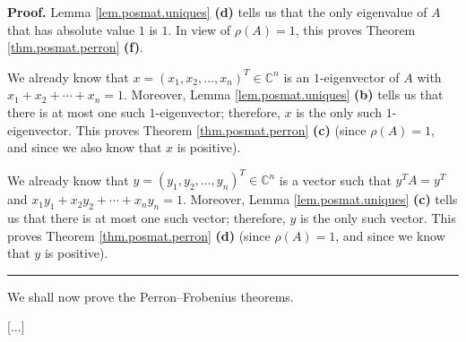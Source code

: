 \documentclass[numbers=enddot,12pt,final,onecolumn,notitlepage]{scrartcl}%
\numberwithin{exer}{subsection}
\theoremstyle{definition}
\newenvironment{proof}[1][Proof]{\noindent\textbf{#1.} }{\ \rule{0.5em}{0.5em}}
\begin{document}
\begin{proof}
Lemma \ref{lem.posmat.uniques} \textbf{(d)} tells us that the only eigenvalue
of $A$ that has absolute value $1$ is $1$. In view of $\rho\left(  A\right)
=1$, this proves Theorem \ref{thm.posmat.perron} \textbf{(f)}.

We already know that $x=\left(  x_{1},x_{2},\ldots,x_{n}\right)  ^{T}%
\in\mathbb{C}^{n}$ is an $1$-eigenvector of $A$ with $x_{1}+x_{2}+\cdots
+x_{n}=1$. Moreover, Lemma \ref{lem.posmat.uniques} \textbf{(b)} tells us that
there is at most one such $1$-eigenvector; therefore, $x$ is the only such
$1$-eigenvector. This proves Theorem \ref{thm.posmat.perron} \textbf{(c)}
(since $\rho\left(  A\right)  =1$, and since we also know that $x$ is positive).

We already know that $y=\left(  y_{1},y_{2},\ldots,y_{n}\right)  ^{T}%
\in\mathbb{C}^{n}$ is a vector such that $y^{T}A=y^{T}$ and $x_{1}y_{1}%
+x_{2}y_{2}+\cdots+x_{n}y_{n}=1$. Moreover, Lemma \ref{lem.posmat.uniques}
\textbf{(c)} tells us that there is at most one such vector; therefore, $y$ is
the only such vector. This proves Theorem \ref{thm.posmat.perron} \textbf{(d)}
(since $\rho\left(  A\right)  =1$, and since we know that $y$ is positive).
\end{proof}

We shall now prove the Perron--Frobenius theorems.

[...]

\newpage
\end{document}

